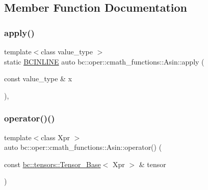 \subsection{Member Function Documentation}
\mbox{\label{structbc_1_1oper_1_1cmath__functions_1_1Asin_adca0c674125baa73bb2445c35b353e45}} 
\subsubsection{\texorpdfstring{apply()}{apply()}}
{\footnotesize\ttfamily template$<$class value\+\_\+type $>$ \\
static \hyperlink{common_8h_a6699e8b0449da5c0fafb878e59c1d4b1}{B\+C\+I\+N\+L\+I\+NE} auto bc\+::oper\+::cmath\+\_\+functions\+::\+Asin\+::apply (\begin{DoxyParamCaption}\item[{const value\+\_\+type \&}]{x }\end{DoxyParamCaption})\hspace{0.3cm}{\ttfamily [inline]}, {\ttfamily [static]}}

\mbox{\label{structbc_1_1oper_1_1cmath__functions_1_1Asin_afcfcf86668a54b5dc378476750c9f0da}} 
\subsubsection{\texorpdfstring{operator()()}{operator()()}\hspace{0.1cm}{\footnotesize\ttfamily [1/3]}}
{\footnotesize\ttfamily template$<$class Xpr $>$ \\
auto bc\+::oper\+::cmath\+\_\+functions\+::\+Asin\+::operator() (\begin{DoxyParamCaption}\item[{const \hyperlink{classbc_1_1tensors_1_1Tensor__Base}{bc\+::tensors\+::\+Tensor\+\_\+\+Base}$<$ Xpr $>$ \&}]{tensor }\end{DoxyParamCaption})\hspace{0.3cm}{\ttfamily [inline]}}

